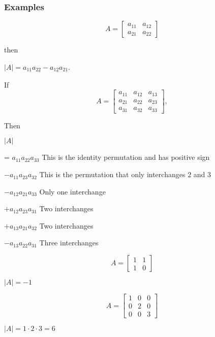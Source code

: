 \documentclass[12pt,a4paper]{article}
\theoremstyle{regla}
\theoremstyle{remark}
\theoremstyle{definition}
\theoremstyle{nonumberbreak}
\begin{document}
\subsubsection{Examples}
\begin{xmpl}

$$A=
\begin{bmatrix}
a_{11} & a_{12}  \\
a_{21} & a_{22} 
\end{bmatrix}$$

then

$\vert A \vert = a_{1\underline{1}} a_{2\underline{2}} - a_{1\underline{2}}a_{2\underline{1}}$.
\end{xmpl}
\begin{xmpl}

If
$$A=
\begin{bmatrix}
a_{11} & a_{12} & a_{13}  \\
a_{21} & a_{22} & a_{23} \\
a_{31} & a_{32} & a_{33}
\end{bmatrix},$$

Then

$\vert A \vert$ 

=  $a_{11} a_{22} a_{33}$   This is the identity permutation and has positive sign

  $-a_{11} a_{23} a_{32}$   This is the permutation that only interchanges $2$ and $3$

  $-a_{12} a_{21} a_{33}$   Only one interchange

  $+a_{12} a_{23} a_{31}$   Two interchanges

  $+a_{13} a_{21} a_{32}$   Two interchanges

  $-a_{13} a_{22} a_{31}$   Three interchanges
\end{xmpl}
\begin{xmpl}


$$A=
\begin{bmatrix}
1 & 1  \\
1 & 0 
\end{bmatrix}$$

$\vert A \vert = -1$

\end{xmpl}
\begin{xmpl}

$$A=
\begin{bmatrix}
1 & 0 & 0  \\
0 & 2 & 0  \\
0 & 0 & 3 
\end{bmatrix}$$

$\vert A \vert = 1 \cdot 2 \cdot 3 = 6$
\end{xmpl}
\end{document}
